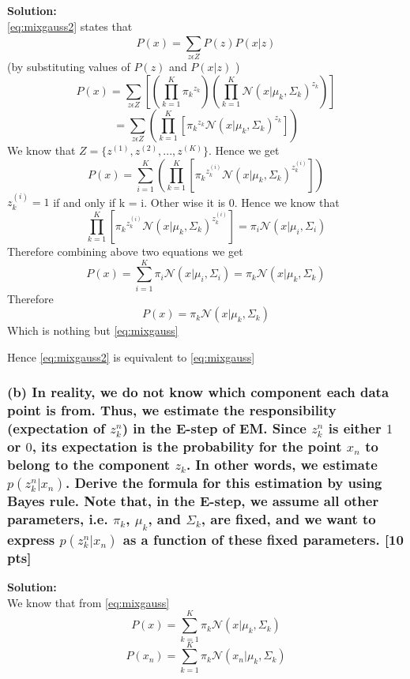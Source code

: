\documentclass[twoside,10pt]{article}
\begin{document}
\textbf{ Solution: }\\
\eqref{eq:mixgauss2} states that 
\begin{equation*}
P(x) = \sum_{z \epsilon Z}^{}{P(z)P(x|z)} 
\end{equation*}
(by substituting values of $P(z)$ and $P(x|z)$ )
\begin{equation*}
P(x) = \sum_{z \epsilon Z}^{}{[(\prod_{k=1}^K {\pi_k}^{z_k}) (\prod_{k=1}^K \mathcal{N}(x|\mu_k,
\Sigma_k)^{z_k})]} 
\end{equation*}
$$ =\sum_{z \epsilon Z}^{}{(\prod_{k=1}^K [{\pi_k}^{z_k} \mathcal{N}(x|\mu_k,
\Sigma_k)^{z_k}])} $$
We know that $ Z = \{z^{(1)}, z^{(2)}, ..., z^{(K)}\} $.
Hence we get 
$$ P(x) =\sum_{i = 1}^{K}{(\prod_{k=1}^K [{\pi_k}^{z_k^{(i)}} \mathcal{N}(x|\mu_k,
\Sigma_k)^{z_k^{(i)} }])} $$
$z_k^{(i)}  = 1$ if and only if k = i. Other wise it is 0. Hence we know that 
$$ 
\prod_{k=1}^K [{\pi_k}^{z_k^{(i)}} \mathcal{N}(x|\mu_k,
\Sigma_k)^{z_k^{(i)} }] = {\pi_i} \mathcal{N}(x|\mu_i,
\Sigma_i)
$$
Therefore combining above two equations we get
$$ 
P(x) = 
\sum_{i = 1}^{K} {\pi_i} \mathcal{N}(x|\mu_i,
\Sigma_i)  = {\pi_k} \mathcal{N}(x|\mu_k,
\Sigma_k)$$
Therefore 
$$ P(x) = {\pi_k} \mathcal{N}(x|\mu_k,\Sigma_k)$$
Which is nothing but \eqref{eq:mixgauss}

Hence \eqref{eq:mixgauss2} is equivalent to
\eqref{eq:mixgauss}


\newpage
\subsubsection*{(b) In reality, we do not know which component each
data point is from. Thus, we estimate the responsibility
(expectation of $z_k^n$) in the E-step of EM. Since $z_k^n$ is either $1$ or $0$, its expectation is the
probability for the point $x_n$ to belong to the component $z_k$. In
other words, we estimate $p(z_k^n|x_n)$. Derive the formula for this
estimation by using Bayes rule. Note that, in the E-step, we assume all other parameters, i.e. $\pi_k$, $\mu_k$,
and $\Sigma_k$, are fixed, and we want to express $p(z_k^n|x_n)$ as a function of these fixed parameters. [10 pts]}
\textbf{ Solution: }\\
\hspace{1cm} We know that from \eqref{eq:mixgauss}
$$ P(x) = \sum_{k = 1}^{K} { {\pi_k} \mathcal{N}(x|\mu_k,\Sigma_k)}$$
\begin{equation} P(x_n) = \sum_{k = 1}^{K} { {\pi_k} \mathcal{N}(x_n|\mu_k,\Sigma_k)} \label{eq:1b_1}\end{equation}
\end{document}
